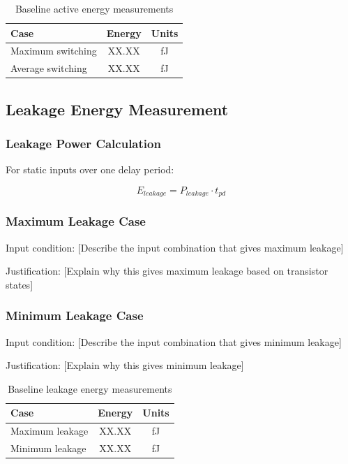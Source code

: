 \documentclass[12pt,letterpaper]{article}
\begin{document}
\begin{table}[H]
\centering
\caption{Baseline active energy measurements}
\label{tab:baseline_active_energy}
\begin{tabular}{@{}lcc@{}}
\toprule
\textbf{Case} & \textbf{Energy} & \textbf{Units} \\
\midrule
Maximum switching & XX.XX & fJ \\
Average switching & XX.XX & fJ \\
\bottomrule
\end{tabular}
\end{table}

\subsection{Leakage Energy Measurement}

\subsubsection{Leakage Power Calculation}

For static inputs over one delay period:

\begin{equation}
E_{leakage} = P_{leakage} \cdot t_{pd}
\end{equation}

\subsubsection{Maximum Leakage Case}

Input condition: [Describe the input combination that gives maximum leakage]

Justification: [Explain why this gives maximum leakage based on transistor states]

\subsubsection{Minimum Leakage Case}

Input condition: [Describe the input combination that gives minimum leakage]

Justification: [Explain why this gives minimum leakage]

\begin{table}[H]
\centering
\caption{Baseline leakage energy measurements}
\label{tab:baseline_leakage}
\begin{tabular}{@{}lcc@{}}
\toprule
\textbf{Case} & \textbf{Energy} & \textbf{Units} \\
\midrule
Maximum leakage & XX.XX & fJ \\
Minimum leakage & XX.XX & fJ \\
\bottomrule
\end{tabular}
\end{table}
\end{document}

